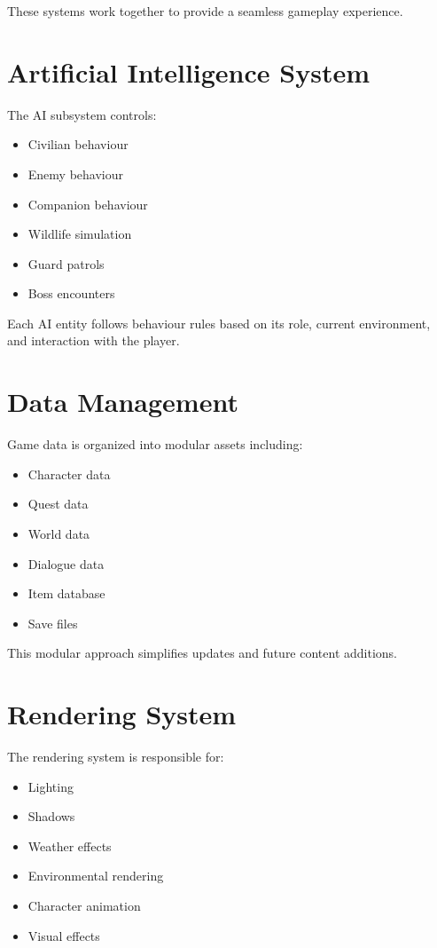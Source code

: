 These systems work together to provide a seamless gameplay experience.

\section{Artificial Intelligence System}

The AI subsystem controls:

\begin{itemize}
    \item Civilian behaviour
    \item Enemy behaviour
    \item Companion behaviour
    \item Wildlife simulation
    \item Guard patrols
    \item Boss encounters
\end{itemize}

Each AI entity follows behaviour rules based on its role, current environment, and interaction with the player.

\section{Data Management}

Game data is organized into modular assets including:

\begin{itemize}
    \item Character data
    \item Quest data
    \item World data
    \item Dialogue data
    \item Item database
    \item Save files
\end{itemize}

This modular approach simplifies updates and future content additions.

\section{Rendering System}

The rendering system is responsible for:

\begin{itemize}
    \item Lighting
    \item Shadows
    \item Weather effects
    \item Environmental rendering
    \item Character animation
    \item Visual effects
\end{itemize}

